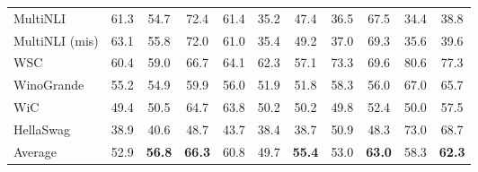 \documentclass[11pt]{article}
\newcommand{\modelname}{LaMini\xspace}
\begin{document}
\begin{table*}[t]
\begin{tabular}{@{}lcccccccccc@{}}
MultiNLI       & 61.3   & 54.7            & 72.4          & 61.4               & 35.2         & 47.4          & 36.5   & 67.5            & 34.4   & 38.8          \\
MultiNLI (mis) & 63.1   & 55.8            & 72.0          & 61.0               & 35.4         & 49.2          & 37.0   & 69.3            & 35.6   & 39.6          \\
WSC         & 60.4   & 59.0            & 66.7          & 64.1               & 62.3         & 57.1          & 73.3   & 69.6            & 80.6   & 77.3          \\
WinoGrande     & 55.2   & 54.9            & 59.9          & 56.0               & 51.9         & 51.8          & 58.3   & 56.0            & 67.0   & 65.7          \\
WiC            & 49.4   & 50.5            & 64.7          & 63.8               & 50.2         & 50.2          & 49.8   & 52.4            & 50.0   & 57.5          \\
HellaSwag      & 38.9   & 40.6            & 48.7          & 43.7               & 38.4         & 38.7          & 50.9   & 48.3            & 73.0   & 68.7          \\ \midrule
Average        & 52.9   & \textbf{56.8}   & \textbf{66.3} & 60.8               & 49.7         & \textbf{55.4} & 53.0   & \textbf{63.0}   & 58.3   & \textbf{62.3} \\ \bottomrule
\end{tabular}
\caption{
Automatic evaluation results of selected language models on 15 NLP tasks.
``Average'' indicates the micro-average of the individual task results.
The best average results are highlighted in \textbf{bold}.
F-T5 and \modelname-F-T5 indicate Flan-T5 and \modelname-Flan-T5 respectively.
C-GPT and \modelname-C indicate Cerebras-GPT and \modelname-Cerebras respectively. \\
\textbf{Note:} We are using lm-eval-harness to evaluate our performance. Therefore, LLaMA numbers are not supposed to be compared from the original paper since we are using different method of measurement.
}
\label{tab:main}
\end{table*} 
\end{document}
